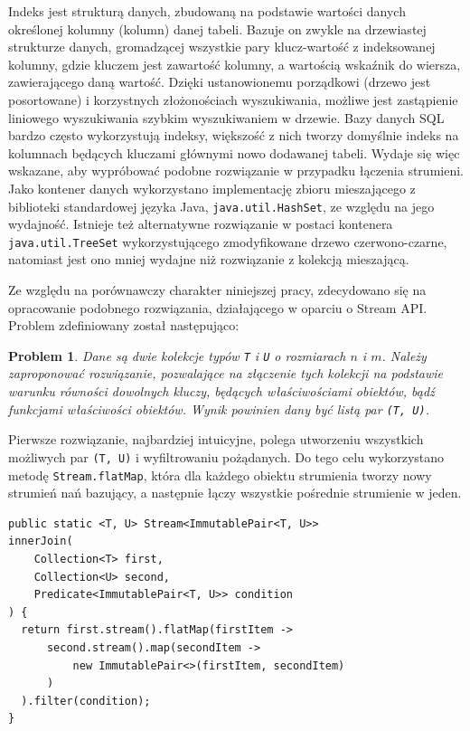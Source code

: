 \documentclass[12pt]{extarticle}
\newtheorem{theorem}{Problem}
\begin{document}
    Indeks jest strukturą danych, zbudowaną na podstawie wartości danych określonej kolumny (kolumn) danej tabeli. Bazuje on zwykle na drzewiastej strukturze danych, gromadzącej wszystkie pary klucz-wartość z indeksowanej kolumny, gdzie kluczem jest zawartość kolumny, a wartością wskaźnik do wiersza, zawierającego daną wartość. Dzięki ustanowionemu porządkowi (drzewo jest posortowane) i korzystnych złożonościach wyszukiwania, możliwe jest zastąpienie liniowego wyszukiwania szybkim wyszukiwaniem w drzewie. Bazy danych SQL bardzo często wykorzystują indeksy, większość z nich tworzy domyślnie indeks na kolumnach będących kluczami głównymi nowo dodawanej tabeli. Wydaje się więc wskazane, aby wypróbować podobne rozwiązanie w przypadku łączenia strumieni. Jako kontener danych wykorzystano implementację zbioru mieszającego z biblioteki standardowej języka Java, \texttt{java.util.HashSet}, ze względu na jego wydajność. Istnieje też alternatywne rozwiązanie w postaci kontenera \texttt{java.util.TreeSet} wykorzystującego zmodyfikowane drzewo czerwono-czarne, natomiast jest ono mniej wydajne niż rozwiązanie z kolekcją mieszającą.

    Ze względu na porównawczy charakter niniejszej pracy, zdecydowano się na opracowanie podobnego rozwiązania, działającego w oparciu o Stream API. Problem zdefiniowany został następująco:

\begin{theorem}
    Dane są dwie kolekcje typów \texttt{T} i \texttt{U} o rozmiarach $ n $ i $ m $. Należy zaproponować rozwiązanie, pozwalające na złączenie tych kolekcji na podstawie warunku równości dowolnych kluczy, będących właściwościami obiektów, bądź funkcjami właściwości obiektów. Wynik powinien dany być listą par \texttt{(T, U)}.
\end{theorem}

    Pierwsze rozwiązanie, najbardziej intuicyjne, polega utworzeniu wszystkich możliwych par \texttt{(T, U)} i wyfiltrowaniu pożądanych. Do tego celu wykorzystano metodę \texttt{Stream.flatMap}, która dla każdego obiektu strumienia tworzy nowy strumień nań bazujący, a następnie łączy wszystkie pośrednie strumienie w jeden.

\begin{lstlisting}[label=join1, caption=Rozwiązanie nr 1]
public static <T, U> Stream<ImmutablePair<T, U>>
innerJoin(
    Collection<T> first,
    Collection<U> second,
    Predicate<ImmutablePair<T, U>> condition
) {
  return first.stream().flatMap(firstItem ->
      second.stream().map(secondItem ->
          new ImmutablePair<>(firstItem, secondItem)
      )
  ).filter(condition);
}

\end{lstlisting}
\end{document}
